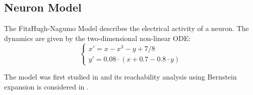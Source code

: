 \begin{appendices}
\section{Neuron Model}
The FitzHugh-Nagumo Model describes the electrical activity of a neuron. The dynamics are given by the two-dimensional non-linear ODE:
\begin{equation}
  \begin{cases}
  x' = x - x^3 - y + 7/8 \\
  y' = 0.08\cdot(x + 0.7 - 0.8\cdot y)
  \end{cases}
 \end{equation}

\noindent The model was first studied in \cite{fitzhugh1961impulses} and its reachability analysis using Bernstein expansion is considered in \cite{dang2012reachability}.

\end{appendices}
